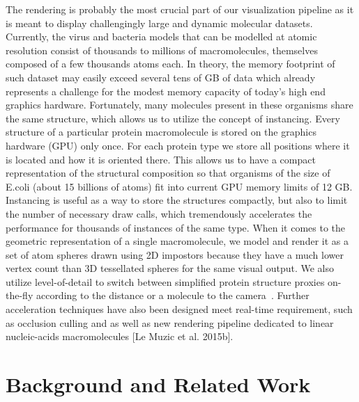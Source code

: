 The rendering is probably the most crucial part of our visualization pipeline as it is meant to display challengingly large and dynamic molecular datasets.
Currently, the virus and bacteria models that can be modelled at atomic resolution consist of thousands to millions of macromolecules, themselves composed of a few thousands atoms each.
In theory, the memory footprint of such dataset may easily exceed several tens of GB of data which already represents a challenge for the modest memory capacity of today's high end graphics hardware.
Fortunately, many molecules present in these organisms share the same structure, which allows us to utilize the concept of instancing.
Every structure of a particular protein macromolecule is stored on the graphics hardware (GPU) only once. 
For each protein type we store all positions where it is located and how it is oriented there. 
This allows us to have a compact representation of the structural composition so that organisms of the size of E.coli (about 15 billions of atoms) fit into current GPU memory limits of 12 GB. 
Instancing is useful as a way to store the structures compactly, but also to limit the number of necessary draw calls, which tremendously accelerates the performance for thousands of instances of the same type. 
When it comes to the geometric representation of a single macromolecule, we model and render it as a set of atom spheres drawn using 2D impostors because they have a much lower vertex count than 3D tessellated spheres for the same visual output.
We also utilize level-of-detail to switch between simplified protein structure proxies on-the-fly according to the distance or a molecule to the camera~\cite{le2014illustrative}.
Further acceleration techniques have also been designed meet real-time requirement, such as occlusion culling and as well as new rendering pipeline dedicated to linear nucleic-acids macromolecules [Le Muzic et al. 2015b]. 


\section{Background and Related Work}

